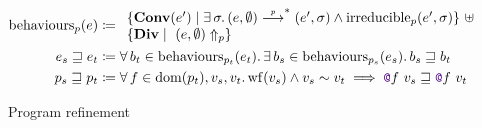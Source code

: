 \begin{figure}[tp]
    \centering
    \\
    \begin{align*}
        	\mathrm{behaviours}_p (e)
        	&\coloneqq
        	\begin{array}{l}
        			\{ \constr[e']{Conv} \mid \exists \sigma \ldotp (e, \emptyset) \step{p}^* (e', \sigma) \wedge \mathrm{irreducible}_p (e', \sigma) \}\ \uplus
        		\\
        			\{ \constr{Div} \mid\ \diverges{p}{(e, \emptyset)} \}
            \end{array}
        \\
            e_s \refined e_t
            &\coloneqq
            \forall b_t \in \mathrm{behaviours}_{p_t} (e_t) \ldotp
            \exists b_s \in \mathrm{behaviours}_{p_s} (e_s) \ldotp
            b_s \refined b_t
        \\
            p_s \refined p_t
            &\coloneqq
            \forall f \in \dom{p_t}, v_s, v_t \ldotp
            \wf{v_s} \wedge v_s \similar v_t \implies
            \lambdCall{\lambdFunc{f}}{v_s} \refined \lambdCall{\lambdFunc{f}}{v_t}
    \end{align*}
    \caption{Program refinement}
    \label{fig:refinement}
\end{figure}
